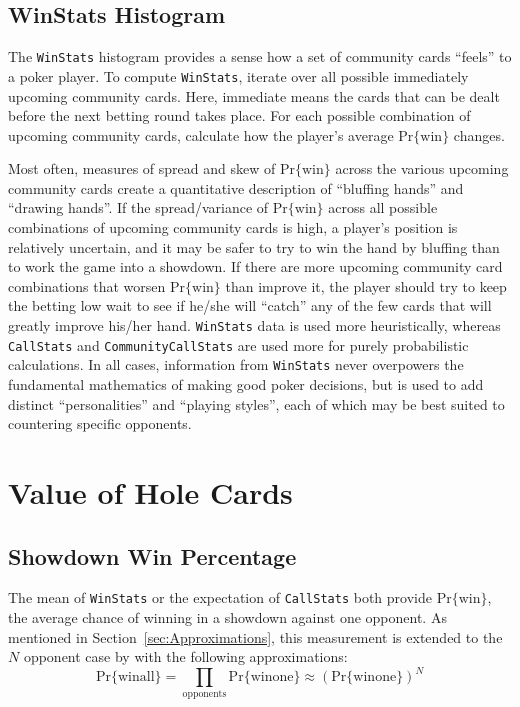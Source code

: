 \subsection{WinStats Histogram}
\label{sec:WinStats}

The \texttt{WinStats} histogram provides a sense how a set of community cards ``feels'' to a poker player.
To compute \texttt{WinStats}, iterate over all possible immediately upcoming community cards.
Here, immediate means the cards that can be dealt before the next betting round takes place.
For each possible combination of upcoming community cards, calculate how the player's average $\mathrm{Pr\{win\}}$ changes.

Most often, measures of spread and skew of $\mathrm{Pr\{win\}}$ across the various upcoming community cards create a quantitative description of ``bluffing hands'' and ``drawing hands''.
If the spread/variance of $\mathrm{Pr\{win\}}$ across all possible combinations of upcoming community cards is high, a player's position is relatively uncertain, and it may be safer to try to win the hand by bluffing than to work the game into a showdown.
If there are more upcoming community card combinations that worsen $\mathrm{Pr\{win\}}$ than improve it, the player should try to keep the betting low wait to see if he/she will ``catch'' any of the few cards that will greatly improve his/her hand.
\texttt{WinStats} data is used more heuristically, whereas \texttt{CallStats} and \texttt{CommunityCallStats} are used more for purely probabilistic calculations.
In all cases, information from \texttt{WinStats} never overpowers the fundamental mathematics of making good poker decisions, but is used to add distinct ``personalities'' and ``playing styles'', each of which may be best suited to countering specific opponents.


\section{Value of Hole Cards}



\subsection{Showdown Win Percentage}
\label{sec:Mean}
The mean of \texttt{WinStats} or the expectation of \texttt{CallStats} both provide $\mathrm{Pr\{win\}}$, the average chance of winning in a showdown against one opponent.
As mentioned in Section~\ref{sec:Approximations}, this measurement is extended to the $N$ opponent case by with the following approximations:
\[
\mathrm{Pr\{win all\}} = \prod_{\mathrm{opponents}} \mathrm{Pr\{win one\}} \approx \left( \mathrm{Pr\{win one\}} \right)^N
\]


